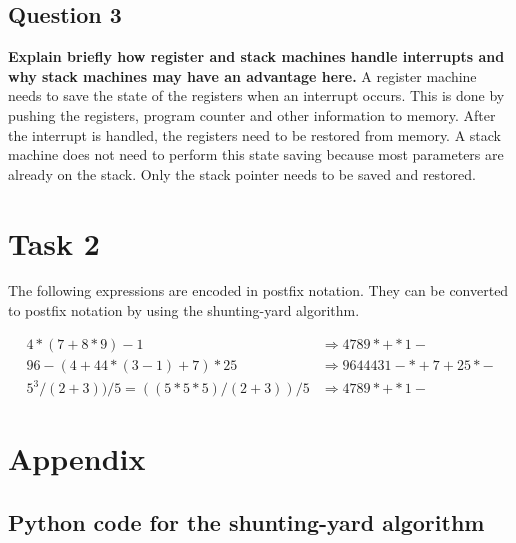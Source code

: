 \subsection*{Question 3}
\textbf{Explain briefly how register and stack machines handle interrupts and why stack machines may have an advantage here.}
A register machine needs to save the state of the registers when an interrupt occurs. This is done by pushing the registers, program counter and other information to memory. After the interrupt is handled, the registers need to be restored from memory. A stack machine does not need to perform this state saving because most parameters are already on the stack. Only the stack pointer needs to be saved and restored.


\section*{Task 2}

The following expressions are encoded in postfix notation. They can be converted to postfix notation by using the shunting-yard algorithm.

\begin{align*}
  4 * (7 + 8 * 9) - 1 &\Rightarrow   4789*+*1- \\
  96 - (4 + 44 * (3 - 1) + 7) * 25 &\Rightarrow   9644431-*+7+25*-\\
  5^{3} / ( 2 + 3)) / 5=((5*5*5) / ( 2 + 3)) / 5 &\Rightarrow   4789*+*1-
\end{align*}
\section*{Appendix}
\subsection*{Python code for the shunting-yard algorithm}


